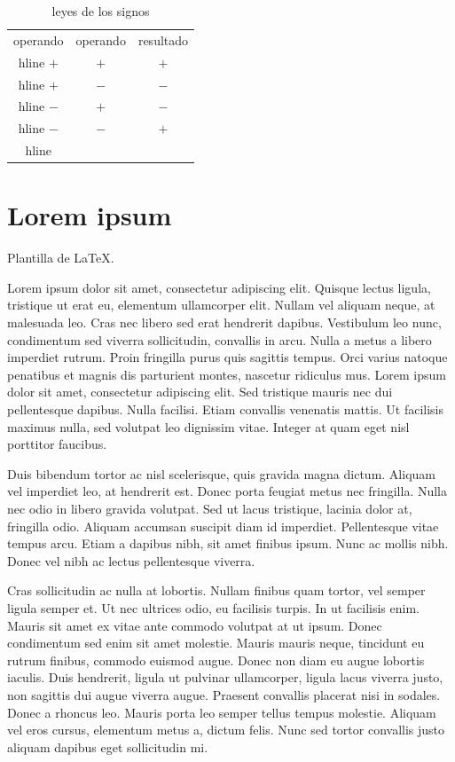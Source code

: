 \documentclass{book}
\begin{document}
\begin{table}[h]
  \centering
  \begin{tabular}{c c c}
    \hline
    operando & operando & resultado\\hline  
    $+$ & $+$ & $+$\\hline
    $+$ & $-$ & $-$\\hline
    $-$ & $+$ & $-$\\hline
    $-$ & $-$ & $+$\\hline
  \end{tabular}
  \caption{leyes de los signos}
  \label{tabla: leyes de signos}
\end{table}






\chapter{Lorem ipsum}

Plantilla de \LaTeX.


Lorem ipsum dolor sit amet, consectetur adipiscing elit. Quisque lectus ligula,
tristique ut erat eu, elementum ullamcorper elit. Nullam vel aliquam neque, at
malesuada leo. Cras nec libero sed erat hendrerit dapibus. Vestibulum leo nunc,
condimentum sed viverra sollicitudin, convallis in arcu. Nulla a metus a libero
imperdiet rutrum. Proin fringilla purus quis sagittis tempus. Orci varius
natoque penatibus et magnis dis parturient montes, nascetur ridiculus mus. Lorem
ipsum dolor sit amet, consectetur adipiscing elit. Sed tristique mauris nec dui
pellentesque dapibus. Nulla facilisi. Etiam convallis venenatis mattis. Ut
facilisis maximus nulla, sed volutpat leo dignissim vitae. Integer at quam eget
nisl porttitor faucibus.

Duis bibendum tortor ac nisl scelerisque, quis gravida magna dictum. Aliquam vel
imperdiet leo, at hendrerit est. Donec porta feugiat metus nec fringilla. Nulla
nec odio in libero gravida volutpat. Sed ut lacus tristique, lacinia dolor at,
fringilla odio. Aliquam accumsan suscipit diam id imperdiet. Pellentesque vitae
tempus arcu. Etiam a dapibus nibh, sit amet finibus ipsum. Nunc ac mollis
nibh. Donec vel nibh ac lectus pellentesque viverra.

Cras sollicitudin ac nulla at lobortis. Nullam finibus quam tortor, vel semper
ligula semper et. Ut nec ultrices odio, eu facilisis turpis. In ut facilisis
enim. Mauris sit amet ex vitae ante commodo volutpat at ut ipsum. Donec
condimentum sed enim sit amet molestie. Mauris mauris neque, tincidunt eu rutrum
finibus, commodo euismod augue. Donec non diam eu augue lobortis iaculis. Duis
hendrerit, ligula ut pulvinar ullamcorper, ligula lacus viverra justo, non
sagittis dui augue viverra augue. Praesent convallis placerat nisi in
sodales. Donec a rhoncus leo. Mauris porta leo semper tellus tempus
molestie. Aliquam vel eros cursus, elementum metus a, dictum felis. Nunc sed
tortor convallis justo aliquam dapibus eget sollicitudin mi.
\end{document}
